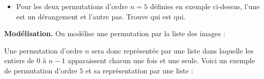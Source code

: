 \documentclass[11pt,class=report,crop=false]{standalone}
\begin{document}
\begin{cours}[Dérangements]
\begin{itemize}
   \item Pour les deux permutations d'ordre $n=5$ définies en exemple ci-dessus, l'une est un dérangement et l'autre pas. Trouve qui est qui.

\end{itemize}
   
   
   
\textbf{Modélisation.}
On modélise une permutation par la liste des images :

Une permutation d'ordre $n$ sera donc représentée par une liste dans laquelle les entiers de $0$ à $n-1$ apparaissent chacun une fois et une seule.
Voici un exemple de permutation d'ordre $5$ et sa représentation par une liste :

\end{cours}



\end{document}

